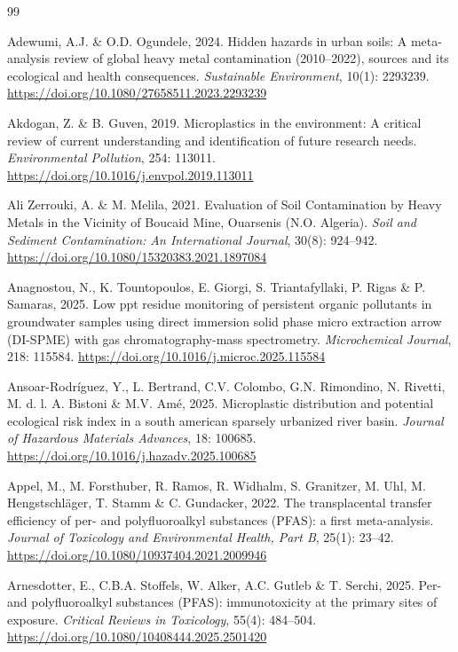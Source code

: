 \documentclass[sn-mathphys-num]{sn-jnl}
\begin{document}
\begin{thebibliography}{99}

Adewumi, A.J. \& O.D. Ogundele, 2024.
Hidden hazards in urban soils: A meta-analysis review of global heavy metal
contamination (2010--2022), sources and its ecological and health
consequences.
\textit{Sustainable Environment}, 10(1): 2293239.
\url{https://doi.org/10.1080/27658511.2023.2293239}

Akdogan, Z. \& B. Guven, 2019.
Microplastics in the environment: A critical review of current understanding
and identification of future research needs.
\textit{Environmental Pollution}, 254: 113011.
\url{https://doi.org/10.1016/j.envpol.2019.113011}

Ali Zerrouki, A. \& M. Melila, 2021.
Evaluation of Soil Contamination by Heavy Metals in the Vicinity of Boucaid
Mine, Ouarsenis (N.O. Algeria).
\textit{Soil and Sediment Contamination: An International Journal},
30(8): 924--942.
\url{https://doi.org/10.1080/15320383.2021.1897084}

Anagnostou, N., K. Tountopoulos, E. Giorgi, S. Triantafyllaki, P. Rigas \&
P. Samaras, 2025.
Low ppt residue monitoring of persistent organic pollutants in groundwater
samples using direct immersion solid phase micro extraction arrow (DI-SPME)
with gas chromatography-mass spectrometry.
\textit{Microchemical Journal}, 218: 115584.
\url{https://doi.org/10.1016/j.microc.2025.115584}

Ansoar-Rodr\'{i}guez, Y., L. Bertrand, C.V. Colombo, G.N. Rimondino,
N. Rivetti, M. d. l. A. Bistoni \& M.V. Am\'{e}, 2025.
Microplastic distribution and potential ecological risk index in a south
american sparsely urbanized river basin.
\textit{Journal of Hazardous Materials Advances}, 18: 100685.
\url{https://doi.org/10.1016/j.hazadv.2025.100685}

Appel, M., M. Forsthuber, R. Ramos, R. Widhalm, S. Granitzer, M. Uhl,
M. Hengstschl\"{a}ger, T. Stamm \& C. Gundacker, 2022.
The transplacental transfer efficiency of per- and polyfluoroalkyl substances
(PFAS): a first meta-analysis.
\textit{Journal of Toxicology and Environmental Health, Part B},
25(1): 23--42.
\url{https://doi.org/10.1080/10937404.2021.2009946}

Arnesdotter, E., C.B.A. Stoffels, W. Alker, A.C. Gutleb \& T. Serchi, 2025.
Per- and polyfluoroalkyl substances (PFAS): immunotoxicity at the primary
sites of exposure.
\textit{Critical Reviews in Toxicology}, 55(4): 484--504.
\url{https://doi.org/10.1080/10408444.2025.2501420}


\end{thebibliography}
\end{document}
